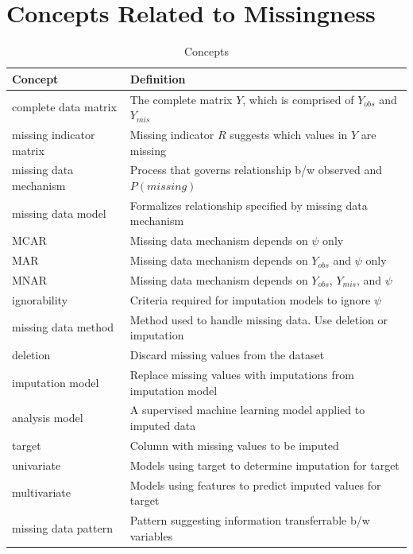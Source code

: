 \documentclass[12pt,oneside]{chicagocapstone}
\begin{document}
\chapter{Concepts Related to
Missingness}\label{concepts-related-to-missingness}
\begin{table}[!h]

\caption{\label{tab:appendixdconcepts}Concepts}
\begin{tabu} to 
\toprule
\begingroup\fontsize{13}{15}\selectfont \textbf{Concept}\endgroup & \begingroup\fontsize{13}{15}\selectfont \textbf{Definition}\endgroup\\
\midrule
complete data matrix & The complete matrix $Y$, which is comprised of $Y_{obs}$ and $Y_{mis}$\\
missing indicator matrix & Missing indicator $R$ suggests which values in $Y$ are missing\\
missing data mechanism & Process that governs relationship b/w observed and $P(missing)$\\
missing data model & Formalizes relationship specified by missing data mechanism\\
MCAR & Missing data mechanism depends on $\psi$ only\\
\addlinespace
MAR & Missing data mechanism depends on $Y_{obs}$ and $\psi$ only\\
MNAR & Missing data mechanism depends on $Y_{obs}$, $Y_{mis}$, and $\psi$\\
ignorability & Criteria required for imputation models to ignore $\psi$\\
missing data method & Method used to handle missing data. Use deletion or imputation\\
deletion & Discard missing values from the dataset\\
\addlinespace
imputation model & Replace missing values with imputations from imputation model\\
analysis model & A supervised machine learning model applied to imputed data\\
target & Column with missing values to be imputed\\
univariate & Models using target to determine imputation for target\\
multivariate & Models using features to predict imputed values for target\\
\addlinespace
missing data pattern & Pattern suggesting information transferrable b/w variables\\

\end{tabu}
\end{table}
\end{document}
